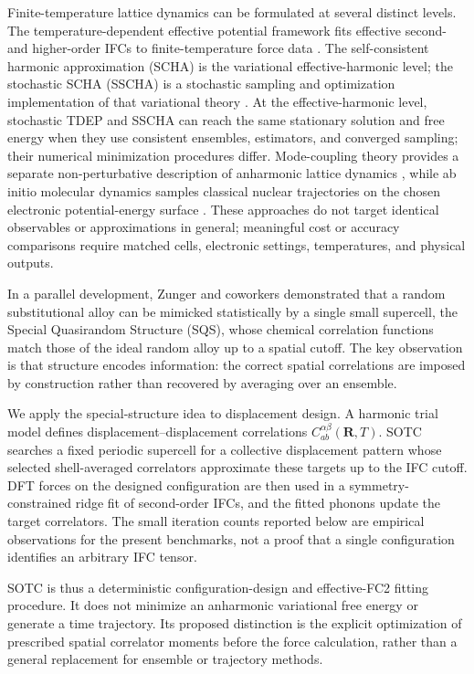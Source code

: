 \documentclass[aps,prb,reprint,amsmath,amssymb,floatfix]{revtex4-2}
\begin{document}
\color{revisionblue}
Finite-temperature lattice dynamics can be formulated at several distinct
levels. The temperature-dependent effective potential framework fits effective
second- and higher-order IFCs to finite-temperature force data
\cite{ref5,ref6,ref10,ref52}. The self-consistent harmonic approximation (SCHA)
is the variational effective-harmonic level; the stochastic SCHA (SSCHA) is a
stochastic sampling and optimization implementation of that variational theory
\cite{ref7,ref8,ref50}. At the effective-harmonic level, stochastic TDEP and
SSCHA can reach the same stationary solution and free energy when they use
consistent ensembles, estimators, and converged sampling; their numerical
minimization procedures differ. Mode-coupling theory provides a separate
non-perturbative description of anharmonic lattice dynamics \cite{ref51}, while
ab initio molecular dynamics samples classical nuclear trajectories on the
chosen electronic potential-energy surface \cite{ref9}. These approaches do not
target identical observables or approximations in general; meaningful cost or
accuracy comparisons require matched cells, electronic settings, temperatures,
and physical outputs.
\color{black}

In a parallel development, Zunger and coworkers \cite{ref12}
demonstrated that a random substitutional alloy can be mimicked
statistically by a single small supercell, the Special Quasirandom
Structure (SQS), whose chemical correlation functions match those of the
ideal random alloy up to a spatial cutoff. The key observation is that
structure encodes information: the correct spatial correlations are
imposed by construction rather than recovered by averaging over an
ensemble.

\color{revisionblue}
We apply the special-structure idea to displacement design. A harmonic trial
model defines displacement--displacement correlations
\(C_{ab}^{\alpha\beta}(\mathbf R,T)\). SOTC searches a fixed periodic
supercell for a collective displacement pattern whose selected shell-averaged
correlators approximate these targets up to the IFC cutoff. DFT forces on the
designed configuration are then used in a symmetry-constrained ridge fit of
second-order IFCs, and the fitted phonons update the target correlators. The
small iteration counts reported below are empirical observations for the
present benchmarks, not a proof that a single configuration identifies an
arbitrary IFC tensor.
\color{black}

\color{revisionblue}
SOTC is thus a deterministic configuration-design and effective-FC2 fitting
procedure. It does not minimize an anharmonic variational free energy or
generate a time trajectory. Its proposed distinction is the explicit
optimization of prescribed spatial correlator moments before the force
calculation, rather than a general replacement for ensemble or trajectory
methods.
\color{black}
\end{document}
